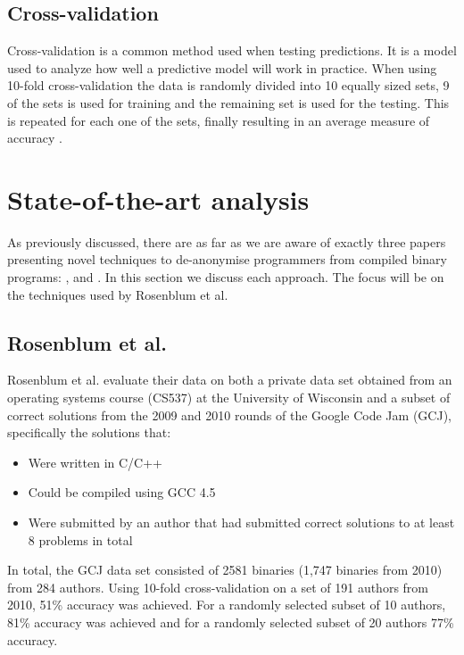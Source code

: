 \documentclass[a4paper,11pt]{kth-mag}
\begin{document}
\subsection{Cross-validation}
Cross-validation is a common method used when testing predictions. It is a
model used to analyze how well a predictive model will work in practice. When
using 10-fold cross-validation the data is randomly divided into 10 equally
sized sets, 9 of the sets is used for training and the remaining set is used
for the testing. This is repeated for each one of the sets, finally resulting
in an average measure of accuracy \parencite{hsu2003practical}.        

\section{State-of-the-art analysis}
As previously discussed, there are as far as we are aware of exactly three
papers presenting novel techniques to de-anonymise programmers from compiled
binary programs: \parencite{rosenblum2011wrote}, \parencite{alrabaee2014oba2}
and \parencite{caliskan2015coding}. In this section we discuss each approach.
The focus will be on the techniques used by Rosenblum et al.

\subsection{Rosenblum et al.}
Rosenblum et al. evaluate their data on both a private data set obtained from
an operating systems course (CS537) at the University of Wisconsin and a subset
of correct solutions from the 2009 and 2010 rounds of the Google Code Jam
(GCJ), specifically the solutions that:

\begin{itemize}
\item Were written in C/C++
\item Could be compiled using GCC 4.5 
\item Were submitted by an author that had submitted correct solutions to at
      least 8 problems in total
\end{itemize}

In total, the GCJ data set consisted of 2581 binaries (1,747 binaries from
2010) from 284 authors. Using 10-fold cross-validation on a set of 191 authors
from 2010, 51\% accuracy was achieved. For a randomly selected subset of 10
authors, 81\% accuracy was achieved and for a randomly selected subset of 20
authors 77\% accuracy.
\end{document}
